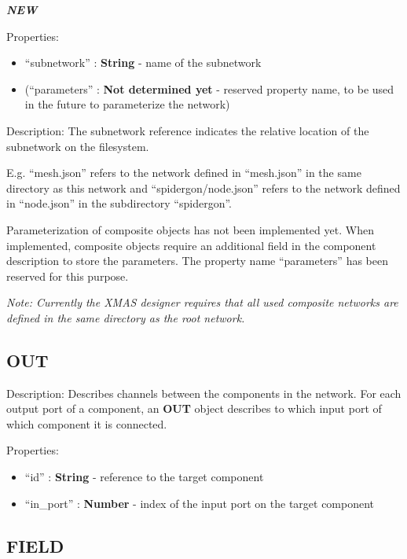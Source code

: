 \textbf{\emph{NEW}}

Properties:

\begin{itemize}
\itemsep1pt\parskip0pt
\item
  ``subnetwork'' : \textbf{String} - name of the subnetwork
\item
  (``parameters'' : \textbf{Not determined yet} - reserved property
  name, to be used in the future to parameterize the network)
\end{itemize}

Description: The subnetwork reference indicates the relative location of
the subnetwork on the filesystem.

E.g. ``mesh.json'' refers to the network defined in ``mesh.json'' in the
same directory as this network and ``spidergon/node.json'' refers to the
network defined in ``node.json'' in the subdirectory ``spidergon''.

Parameterization of composite objects has not been implemented yet. When
implemented, composite objects require an additional field in the
component description to store the parameters. The property name
``parameters'' has been reserved for this purpose.

\emph{Note: Currently the XMAS designer requires that all used composite
networks are defined in the same directory as the root network.}

\subsection{OUT}\label{out}

Description: Describes channels between the components in the network.
For each output port of a component, an \textbf{OUT} object describes to
which input port of which component it is connected.

Properties:

\begin{itemize}
\itemsep1pt\parskip0pt
\item
  ``id'' : \textbf{String} - reference to the target component
\item
  ``in\_port'' : \textbf{Number} - index of the input port on the target
  component
\end{itemize}

\subsection{FIELD}\label{field}

